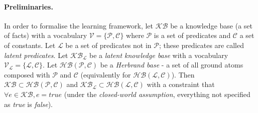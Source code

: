 


\paragraph{Preliminaries.}
In order to formalise the learning framework, let $\mathcal{KB}$ be a knowledge base (a set of facts) with a vocabulary $\mathcal{V} = \{ \mathcal{P}, \mathcal{C}\}$ where $\mathcal{P}$ is a set of predicates and $\mathcal{C}$ a set of constants.
Let $\mathcal{L}$ be a set of predicates not in $\mathcal{P}$; these predicates are called \textit{latent predicates}.
Let $\mathcal{KB}_{\mathcal{L}}$ be a \textit{latent knowledge base} with a vocabulary $\mathcal{V}_{\mathcal{L}} = \{\mathcal{L}, \mathcal{C}\}$.
Let $\mathcal{HB(P,C)}$ be a \textit{Herbrand base} - a set of all ground atoms composed with $\mathcal{P}$ and $\mathcal{C}$ (equivalently for $\mathcal{HB(L,C)}$).
Then $\mathcal{KB} \subset \mathcal{HB(P,C)}$ and $\mathcal{KB}_{\mathcal{L}} \subset \mathcal{HB(L,C)}$ with a constraint that $\forall e \in \mathcal{KB}, e = true$ (under the \textit{closed-world assumption}, everything not specified as \textit{true} is \textit{false}).




